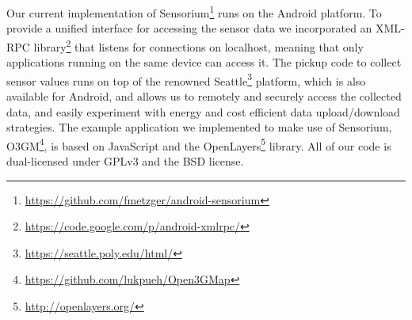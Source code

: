 
Our current implementation of Sensorium\footnote{\url{https://github.com/fmetzger/android-sensorium}} runs on the Android platform. To provide a unified interface for accessing the sensor data we incorporated an \acrshort{XML}-\acrshort{RPC} library\footnote{\url{https://code.google.com/p/android-xmlrpc/}} that listens for connections on localhost, meaning that only applications running on the same device can access it. 
The pickup code to collect sensor values runs on top of the renowned Seattle\footnote{\url{https://seattle.poly.edu/html/}} platform, which is also available for Android, and allows us to remotely and securely access the collected data, and easily experiment with energy and cost efficient data upload/download strategies. 
The example application we implemented to make use of Sensorium, O3GM\footnote{\url{https://github.com/lukpueh/Open3GMap}}, is based on JavaScript and the OpenLayers\footnote{\url{http://openlayers.org/}} library. All of our code is dual-licensed under \gls{GPLv3} and the \acrshort{BSD} license.


